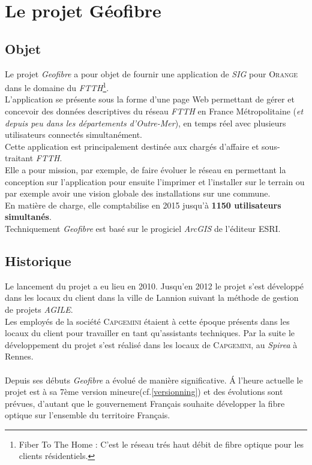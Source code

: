 \chapter{Le projet Géofibre}
\section{Objet}
Le projet \textit{Geofibre} a pour objet de fournir une application de \textit{SIG} pour \textsc{Orange} dans le domaine du \textit{FTTH}\footnote{Fiber To The Home : C'est le réseau trés haut débit de fibre optique pour les clients résidentiels.}.\\
L'application se présente sous la forme d'une page Web permettant de gérer et concevoir des données descriptives du réseau \textit{FTTH} en France Métropolitaine (\textit{et depuis peu dans les départements d'Outre-Mer}), en temps réel avec plusieurs utilisateurs connectés simultanément.\\
Cette application est principalement destinée aux chargés d'affaire et sous-traitant \textit{FTTH}.\\
Elle a pour mission, par exemple, de faire évoluer le réseau en permettant la conception sur l'application pour ensuite l'imprimer et l'installer sur le terrain ou par exemple avoir une vision globale des installations sur une commune.\\
En matière de charge, elle comptabilise en 2015 jusqu'à \textbf{1150 utilisateurs simultanés}.\\
Techniquement \textit{Geofibre} est basé sur le progiciel \textit{ArcGIS} de l'éditeur \textsc{ESRI}.

\newpage
\section{Historique}
Le lancement du projet a eu lieu en 2010. Jusqu'en 2012 le projet s'est développé dans les locaux du client dans la ville de Lannion suivant la méthode de gestion de projets \textit{AGILE}.\\
Les employés de la société \textsc{Capgemini} étaient à cette époque présents dans les locaux du client pour travailler en tant qu'assistants techniques.
Par la suite le développement du projet s'est réalisé dans les locaux de \textsc{Capgemini}, au \textit{Spirea} à Rennes.\\\\
Depuis ses débuts \textit{Geofibre} a évolué de manière significative. \'A l'heure actuelle le projet est à sa 7ème version mineure(cf.\ref{versionning}) et des évolutions sont prévues, d'autant que le gouvernement Français souhaite développer la fibre optique sur l'ensemble du territoire Français.

